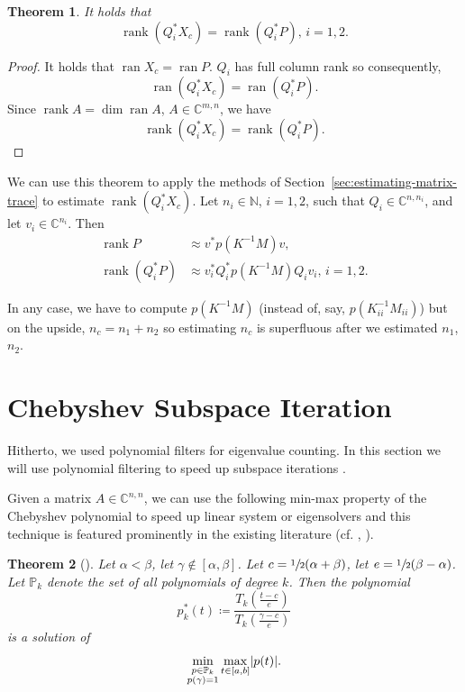 \documentclass[%
	paper=a4,
	fontsize=10pt,
	DIV11,BCOR10mm,
	numbers=noenddot,
	abstract=yes
]{scrartcl}
\newcommand{\F}{\mathbb{C}}
\DeclarePairedDelimiter\abs{\lvert}{\rvert}
\DeclareMathOperator{\ran}{ran}
\DeclareMathOperator{\rank}{rank}
\newtheorem{theorem}{Theorem}[section]
\theoremstyle{definition}
\begin{document}
\begin{theorem}
	It holds that
	\[ \rank(Q_i^* X_c) = \rank(Q_i^* P), \, i = 1, 2. \]
\end{theorem}

\begin{proof}
	It holds that $\ran X_c = \ran P$. $Q_i$ has full column rank so
	consequently,
	\[ \ran(Q_i^* X_c) = \ran(Q_i^* P). \]
	Since $\rank A = \dim \ran A$, $A \in \F^{m,n}$, we have
	\[ \rank(Q_i^* X_c) = \rank(Q_i^* P). \]
\end{proof}

We can use this theorem to apply the methods of
Section~\ref{sec:estimating-matrix-trace} to estimate $\rank(Q_i^* X_c)$. Let
$n_i \in \mathbb{N}$, $i = 1, 2$, such that $Q_i \in \F^{n,n_i}$, and let $v_i
\in \F^{n_i}$. Then
\begin{align*}
	\rank P &\approx v^* p(K^{-1} M) v, \\
	\rank(Q_i^* P) &\approx v_i^* Q_i^* p(K^{-1} M) Q_i v_i, \, i = 1, 2.
\end{align*}

In any case, we have to compute $p(K^{-1} M)$ (instead of, say, $p(K_{ii}^{-1}
M_{ii})$) but on the upside, $n_c = n_1 + n_2$ so estimating $n_c$ is
superfluous after we estimated $n_1$, $n_2$.



\section{Chebyshev Subspace Iteration}

Hitherto, we used polynomial filters for eigenvalue counting. In this section we
will use polynomial filtering to speed up subspace iterations
\cite[§5]{Saad2011}.

Given a matrix $A \in \F^{n,n}$, we can use the following min-max property of
the Chebyshev polynomial to speed up linear system or eigensolvers and this
technique is featured prominently in the existing literature (cf.
\cite[§7]{Saad2011}, \cite[§11.2.8]{Golub2012}).

\begin{theorem}[{\cite[Theorem~4.8]{Saad2011}}]
	Let $\alpha < \beta$, let $\gamma \not\in [\alpha, \beta]$. Let $c =
	\sfrac{1}{2} (\alpha + \beta)$, let $e = \sfrac{1}{2}(\beta - \alpha)$. Let
	$\mathbb{P}_k$ denote the set of all polynomials of degree $k$. Then the
	polynomial
	\[
		p_k^*(t) \coloneqq \frac%
			{T_k \left(\frac{t-c}{e}\right)}
			{T_k \left(\frac{\gamma-c}{e}\right)}
	\]
	is a solution of
	\[
		\min_{\substack{p \in \mathbb{P}_k \\ p(\gamma) = 1}}
		\max_{t \in [a,b]} \abs{p(t)}.
	\]
\end{theorem}
\end{document}
